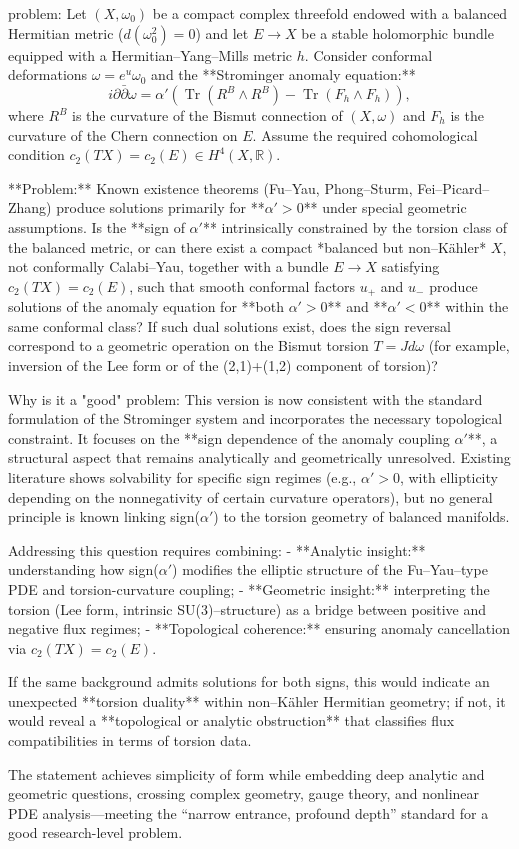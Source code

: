 problem:  
Let \( (X,\omega_0) \) be a compact complex threefold endowed with a balanced Hermitian metric (\(d(\omega_0^2)=0\)) and let \(E \to X\) be a stable holomorphic bundle equipped with a Hermitian–Yang–Mills metric \(h\).  
Consider conformal deformations \(\omega = e^{u}\omega_0\) and the **Strominger anomaly equation:**  
\[
i\partial\bar\partial \omega = \alpha'(\operatorname{Tr}(R^B\wedge R^B) - \operatorname{Tr}(F_h\wedge F_h)),
\]
where \(R^B\) is the curvature of the Bismut connection of \((X,\omega)\) and \(F_h\) is the curvature of the Chern connection on \(E\).  
Assume the required cohomological condition \(c_2(TX)=c_2(E)\in H^4(X,\mathbb{R})\).  

**Problem:**  
Known existence theorems (Fu–Yau, Phong–Sturm, Fei–Picard–Zhang) produce solutions primarily for **\(\alpha'>0\)** under special geometric assumptions.  
Is the **sign of \(\alpha'\)** intrinsically constrained by the torsion class of the balanced metric, or can there exist a compact *balanced but non–Kähler* \(X\), not conformally Calabi–Yau, together with a bundle \(E\to X\) satisfying \(c_2(TX)=c_2(E)\), such that smooth conformal factors \(u_+\) and \(u_-\) produce solutions of the anomaly equation for **both \(\alpha'>0\)** and **\(\alpha'<0\)** within the same conformal class?  
If such dual solutions exist, does the sign reversal correspond to a geometric operation on the Bismut torsion \(T=Jd\omega\) (for example, inversion of the Lee form or of the (2,1)+(1,2) component of torsion)?  

Why is it a "good" problem:  
This version is now consistent with the standard formulation of the Strominger system and incorporates the necessary topological constraint. It focuses on the **sign dependence of the anomaly coupling \(\alpha'\)**, a structural aspect that remains analytically and geometrically unresolved.  
Existing literature shows solvability for specific sign regimes (e.g., \(\alpha'>0\), with ellipticity depending on the nonnegativity of certain curvature operators), but no general principle is known linking sign(\(\alpha'\)) to the torsion geometry of balanced manifolds.  

Addressing this question requires combining:  
- **Analytic insight:** understanding how sign(\(\alpha'\)) modifies the elliptic structure of the Fu–Yau–type PDE and torsion-curvature coupling;  
- **Geometric insight:** interpreting the torsion (Lee form, intrinsic SU(3)–structure) as a bridge between positive and negative flux regimes;  
- **Topological coherence:** ensuring anomaly cancellation via \(c_2(TX)=c_2(E)\).  

If the same background admits solutions for both signs, this would indicate an unexpected **torsion duality** within non–Kähler Hermitian geometry; if not, it would reveal a **topological or analytic obstruction** that classifies flux compatibilities in terms of torsion data.  

The statement achieves simplicity of form while embedding deep analytic and geometric questions, crossing complex geometry, gauge theory, and nonlinear PDE analysis—meeting the “narrow entrance, profound depth” standard for a good research-level problem.